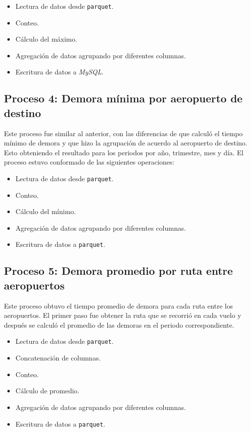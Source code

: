 \begin{itemize}
	\item Lectura de datos desde \texttt{parquet}.
	\item Conteo.
	\item Cálculo del máximo.
	\item Agregación de datos agrupando por diferentes columnas.
	\item Escritura de datos a \textit{MySQL}.
\end{itemize}

\subsection{Proceso 4: Demora mínima por aeropuerto de destino}

Este proceso fue similar al anterior, con las diferencias de que calculó el tiempo mínimo de demora y que hizo la agrupación de acuerdo al aeropuerto de destino. Esto obteniendo el resultado para los periodos por año, trimestre, mes y día. El proceso estuvo conformado de las siguientes operaciones:

\begin{itemize}
	\item Lectura de datos desde \texttt{parquet}.
	\item Conteo.
	\item Cálculo del mínimo.
	\item Agregación de datos agrupando por diferentes columnas.
	\item Escritura de datos a \texttt{parquet}.
\end{itemize}

\subsection{Proceso 5: Demora promedio por ruta entre aeropuertos}

Este proceso obtuvo el tiempo promedio de demora para cada ruta entre los aeropuertos. El primer paso fue obtener la ruta que se recorrió en cada vuelo y después se calculó el promedio de las demoras en el periodo correspondiente.

\begin{itemize}
	\item Lectura de datos desde \texttt{parquet}.
	\item Concatenación de columnas.
	\item Conteo.
	\item Cálculo de promedio.
	\item Agregación de datos agrupando por diferentes columnas.
	\item Escritura de datos a \texttt{parquet}.
\end{itemize}

